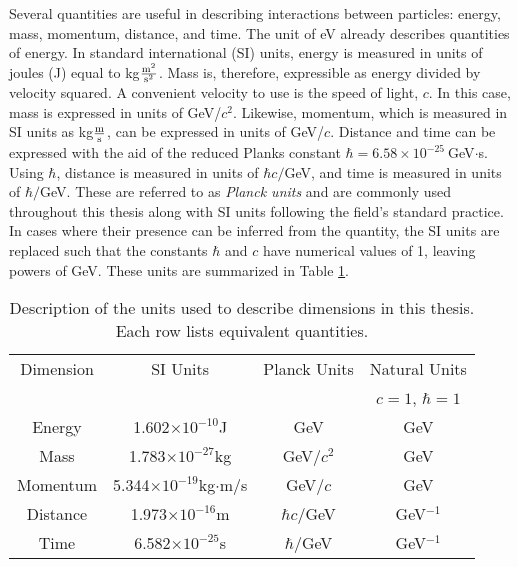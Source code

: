 Several quantities are useful in describing interactions between particles: energy, mass, momentum, distance, and time.
The unit of eV already describes quantities of energy.
In standard international (SI) units, energy is measured in units of joules (J) equal to kg$\frac{\text m^2}{\text s^2}$.           
Mass is, therefore, expressible as energy divided by velocity squared.
A convenient velocity to use is the speed of light, $c$.
In this case, mass is expressed in units of GeV/$c^2$.
Likewise, momentum, which is measured in SI units as kg$\frac{\text m}{\text s}$, can be expressed in units of GeV/$c$.
Distance and time can be expressed with the aid of the reduced Planks constant $\hbar=6.58\times10^{-25}~$GeV$\cdot$s.
Using $\hbar$, distance is measured in units of $\hbar c/$GeV, and time is measured in units of $\hbar/$GeV.
These are referred to as \emph{Planck units} and are commonly used throughout this thesis along with SI units following the field's standard practice.
In cases where their presence can be inferred from the quantity, the SI units are replaced such that the constants $\hbar$ and $c$ have numerical values of 1, leaving powers of GeV.
These units are summarized in Table \ref{tab:units}.

\begin{table}[htp]
\begin{center}
\begin{tabular}{c c c c}
\toprule
Dimension & SI Units &  Planck Units & Natural Units \\
          &          &               & $c=1$, $\hbar = 1$ \\
\midrule
Energy    &    1.602$\times10^{-10}$J               & GeV            & GeV \\
Mass      &    1.783$\times10^{-27}$kg              & GeV/$c^2$      & GeV \\
Momentum  &    5.344$\times10^{-19}$kg$\cdot$m/s    & GeV/$c$        & GeV \\
Distance  &    1.973$\times10^{-16}$m               & $\hbar c/$GeV  & GeV$^{-1}$ \\
Time      &    6.582$\times10^{-25}$s               & $\hbar/$GeV    & GeV$^{-1}$ \\
\bottomrule
\end{tabular}
\caption{Description of the units used to describe dimensions in this thesis. Each row lists equivalent quantities.}
\label{tab:units}
\end{center}
\end{table}

